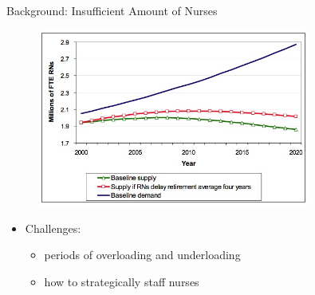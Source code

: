 \documentclass[smaller ,table,usenames,dvipsnames]{beamer}
\newcommand{\?}{\stackrel{?}{=}}
\begin{document}
\begin{frame}{Background: Insufficient Amount of Nurses}
\begin{figure}
    \centering
    \includegraphics[width=0.8\textwidth]{./Figures/not_enough_nurses}
    \label{fig:not_enough_nurses}
\end{figure}

\vspace{-0.2in}
\begin{itemize}
    \item Challenges:
    \begin{itemize}
        \item periods of overloading and underloading
        \item how to strategically staff nurses
    \end{itemize}
\end{itemize}
\end{frame}


\end{document}
